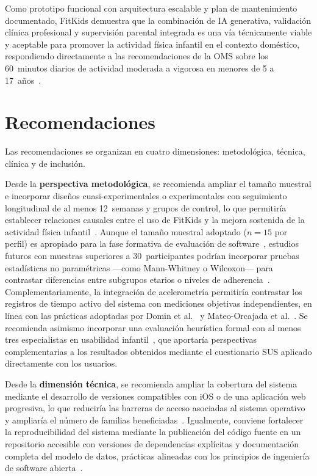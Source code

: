 			Como prototipo funcional con arquitectura escalable y plan de mantenimiento documentado, FitKids demuestra que la combinación de IA generativa, validación clínica profesional y supervisión parental integrada es una vía técnicamente viable y aceptable para promover la actividad física infantil en el contexto doméstico, respondiendo directamente a las recomendaciones de la OMS sobre los 60~minutos diarios de actividad moderada a vigorosa en menores de 5 a 17~años~\cite{Bull2020}.


		\section{Recomendaciones}
		\label{sec:recomend}
			Las recomendaciones se organizan en cuatro dimensiones: metodológica, técnica, clínica y de inclusión.
			
			Desde la \textbf{perspectiva metodológica}, se recomienda ampliar el tamaño muestral e incorporar diseños cuasi-experimentales o experimentales con seguimiento longitudinal de al menos 12~semanas y grupos de control, lo que permitiría establecer relaciones causales entre el uso de FitKids y la mejora sostenida de la actividad física infantil~\cite{GomezCuesta2024,Schoeppe2017}. Aunque el tamaño muestral adoptado ($n = 15$ por perfil) es apropiado para la fase formativa de evaluación de software~\cite{Putnam2020}, estudios futuros con muestras superiores a 30~participantes podrían incorporar pruebas estadísticas no paramétricas ---como Mann-Whitney o Wilcoxon--- para contrastar diferencias entre subgrupos etarios o niveles de adherencia~\cite{HernandezSampieri2014}. Complementariamente, la integración de acelerometría permitiría contrastar los registros de tiempo activo del sistema con mediciones objetivas independientes, en línea con las prácticas adoptadas por Domin et al.~\cite{Domin2022} y Mateo-Orcajada et al.~\cite{MateoOrcajada2024}. Se recomienda asimismo incorporar una evaluación heurística formal con al menos tres especialistas en usabilidad infantil~\cite{Nielsen1994}, que aportaría perspectivas complementarias a los resultados obtenidos mediante el cuestionario SUS aplicado directamente con los usuarios.
			
			Desde la \textbf{dimensión técnica}, se recomienda ampliar la cobertura del sistema mediante el desarrollo de versiones compatibles con iOS o de una aplicación web progresiva, lo que reduciría las barreras de acceso asociadas al sistema operativo y ampliaría el número de familias beneficiadas~\cite{Pressman2020}. Igualmente, conviene fortalecer la reproducibilidad del sistema mediante la publicación del código fuente en un repositorio accesible con versiones de dependencias explícitas y documentación completa del modelo de datos, prácticas alineadas con los principios de ingeniería de software abierta~\cite{Fowler2002,Pressman2020}.
			
